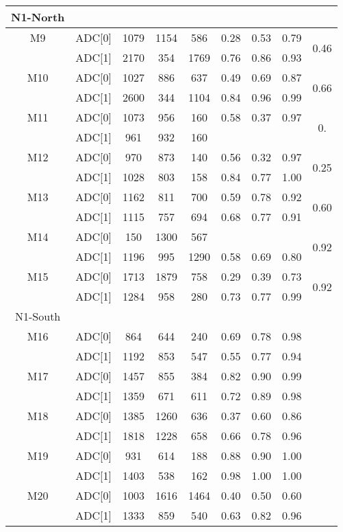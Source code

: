 \begin{longtable}{c c c c c c c c c}
  \midrule
  N1-North\\
  \midrule
  M9  & ADC[0] & 1079 & 1154 & 586 & 0.28 & 0.53 & 0.79 & \multirow{2}{*}{0.46}\\
      & ADC[1] & 2170 & 354 & 1769 & 0.76 & 0.86 & 0.93 & \\
  M10 & ADC[0] & 1027 & 886 & 637 & 0.49 & 0.69 & 0.87 & \multirow{2}{*}{0.66}\\
      & ADC[1] & 2600 & 344 & 1104 & 0.84 & 0.96 & 0.99 & \\
  M11 & ADC[0] & 1073 & 956 & 160 & 0.58 & 0.37 & 0.97 & \multirow{2}{*}{0.}\\
      & ADC[1] & 961 & 932 & 160 &  &  &  & \\
  M12 & ADC[0] & 970 & 873 & 140 & 0.56 & 0.32 & 0.97 & \multirow{2}{*}{0.25}\\
      & ADC[1] & 1028 & 803 & 158 & 0.84 & 0.77 & 1.00 & \\
  M13 & ADC[0] & 1162 & 811 & 700 & 0.59 & 0.78 & 0.92 & \multirow{2}{*}{0.60}\\
      & ADC[1] & 1115 & 757 & 694 & 0.68 & 0.77 & 0.91 & \\
  M14 & ADC[0] & 150 & 1300 & 567 &  &  &  & \multirow{2}{*}{0.92}\\
      & ADC[1] & 1196 & 995 & 1290 & 0.58 & 0.69 & 0.80 & \\
  M15 & ADC[0] & 1713 & 1879 & 758 & 0.29 & 0.39 & 0.73 & \multirow{2}{*}{0.92}\\
      & ADC[1] & 1284 & 958 & 280 & 0.73 & 0.77 & 0.99 & \\
  \midrule
  N1-South\\
  \midrule
  M16 & ADC[0] & 864 & 644 & 240 & 0.69 & 0.78 & 0.98\\
      & ADC[1] & 1192 & 853 & 547 & 0.55 & 0.77 & 0.94\\
  M17 & ADC[0] & 1457 & 855 & 384 & 0.82 & 0.90 & 0.99\\
      & ADC[1] & 1359 & 671 & 611 & 0.72 & 0.89 & 0.98\\
  M18 & ADC[0] & 1385 & 1260 & 636 & 0.37 & 0.60 & 0.86\\
      & ADC[1] & 1818 & 1228 & 658 & 0.66 & 0.78 & 0.96\\
  M19 & ADC[0] & 931 & 614 & 188 & 0.88 & 0.90 & 1.00\\
      & ADC[1] & 1403 & 538 & 162 & 0.98 & 1.00 & 1.00\\
  M20 & ADC[0] & 1003 & 1616 & 1464 & 0.40 & 0.50 & 0.60\\
      & ADC[1] & 1333 & 859 & 540 & 0.63 & 0.82 & 0.96\\

\end{longtable}
